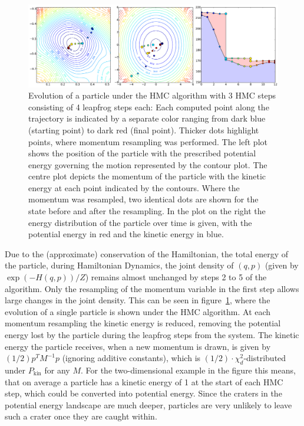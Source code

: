 \begin{figure}[t]
\centering
\includegraphics[width=2.05\columnwidth]{figures/hmc_motion_3hmc_04lf.pdf}
\caption{Evolution of a particle under the HMC algorithm with 3 HMC steps consisting of 4 leapfrog steps each: Each computed point along the trajectory is indicated by a separate color ranging from dark blue (starting point) to dark red (final point). Thicker dots highlight points, where momentum resampling was performed. The left plot shows the position of the particle with the prescribed potential energy governing the motion represented by the contour plot. The centre plot depicts the momentum of the particle with the kinetic energy at each point indicated by the contours. Where the momentum was resampled, two identical dots are shown for the state before and after the resampling. In the plot on the right the energy distribution of the particle over time is given, with the potential energy in red and the kinetic energy in blue.}
\label{fig:HMC_Motion}
\end{figure}

Due to the (approximate) conservation of the Hamiltonian, the total energy of the particle, during Hamiltonian Dynamics, the joint density of $(q,p)$ (given by $\exp \left( -H(q, p) \right)/Z$) remains almost unchanged by steps 2 to 5 of the algorithm. Only the resampling of the momentum variable in the first step allows large changes in the joint density. This can be seen in figure~\ref{fig:HMC_Motion}, where the evolution of a single particle is shown under the HMC algorithm. At each momentum resampling the kinetic energy is reduced, removing the potential energy lost by the particle during the leapfrog steps from the system. The kinetic energy the particle receives, when a new momentum is drawn, is given by $(1/2) p^T M^{-1} p$ (ignoring additive constants), which is $(1/2) \cdot \chi^2_d$-distributed under $P_\textrm{kin}$ for any $M$. For the two-dimensional example in the figure this means, that on average a particle has a kinetic energy of 1 at the start of each HMC step, which could be converted into potential energy. Since the craters in the potential energy landscape are much deeper, particles are very unlikely to leave such a crater once they are caught within.

